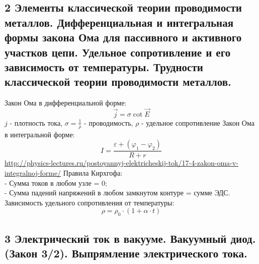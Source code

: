 \documentclass[a4paper,12pt]{article}
\begin{document}
\subsection{2	Элементы классической теории проводимости металлов. Дифференциальная и интегральная формы закона Ома для пассивного и активного участков цепи. Удельное сопротивление и его зависимость от температуры. Трудности классической теории проводимости металлов.}
Закон Ома в дифференциальной форме:\\
\begin{equation}
	\vec{j} = \sigma \cot  \vec{E}
\end{equation}
$j$ - плотность тока, $\sigma = \frac{1}{\rho}$ - проводимость, $\rho$ - удельное сопротивление
Закон Ома в интегральной форме:\\
\begin{equation}
	I = \frac{\varepsilon + (\varphi _1 - \varphi _2)}{R + r}
\end{equation}
\url{http://physics-lectures.ru/postoyannyj-elektricheskij-tok/17-4-zakon-oma-v-integralnoj-forme/}
Правила Кирхгофа:\\
- Сумма токов в любом узле = 0;\\
- Сумма падений напряжений в любом замкнутом контуре = сумме ЭДС.\\
Зависимость удельного сопротивления от температуры:\\
\begin{equation}
	\rho = \rho _0 \cdot (1 + \alpha \cdot t)
\end{equation}

\subsection{3	Электрический ток в вакууме. Вакуумный диод. (Закон 3/2). Выпрямление электрического тока.}
\end{document}

